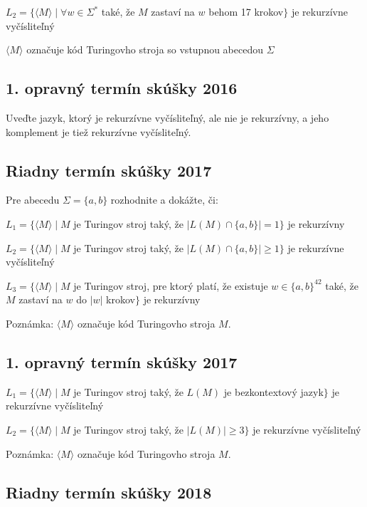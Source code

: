 \documentclass[11pt,a4paper]{article}
\begin{document}
		$L_2 = \{\langle M \rangle \mid \forall w \in \Sigma^*$ také, že $M$ zastaví na $w$ behom 17 krokov$\}$ je rekurzívne vyčísliteľný

		$\langle M \rangle$ označuje kód Turingovho stroja so vstupnou abecedou $\Sigma$

		\subsection{1. opravný termín skúšky 2016}

		Uveďte jazyk, ktorý je rekurzívne vyčísliteľný, ale nie je rekurzívny, a jeho komplement je tiež rekurzívne vyčísliteľný.

		\subsection{Riadny termín skúšky 2017}

		Pre abecedu $\Sigma = \{a, b\}$ rozhodnite a dokážte, či:

		$L_1 = \{\langle M \rangle \mid M$ je Turingov stroj taký, že $\vert L(M) \cap \{a,b\} \vert = 1\}$ je rekurzívny

		$L_2 = \{\langle M \rangle \mid M$ je Turingov stroj taký, že $\vert L(M) \cap \{a,b\} \vert \geq 1\}$ je rekurzívne vyčísliteľný

		$L_3 = \{\langle M \rangle \mid M$ je Turingov stroj, pre ktorý platí, že existuje $w \in \{a,b\}^{42}$ také, že $M$ zastaví na $w$ do $\vert w \vert$ krokov$\}$ je rekurzívny

		Poznámka: $\langle M \rangle$ označuje kód Turingovho stroja $M$.

		\subsection{1. opravný termín skúšky 2017}

		$L_1 = \{\langle M \rangle \mid M$ je Turingov stroj taký, že $L(M)$ je bezkontextový jazyk$\}$ je rekurzívne vyčísliteľný

		$L_2 = \{\langle M \rangle \mid M$ je Turingov stroj taký, že $\vert L(M) \vert \geq 3\}$ je rekurzívne vyčísliteľný

		Poznámka: $\langle M \rangle$ označuje kód Turingovho stroja $M$.

		\subsection{Riadny termín skúšky 2018}
\end{document}
